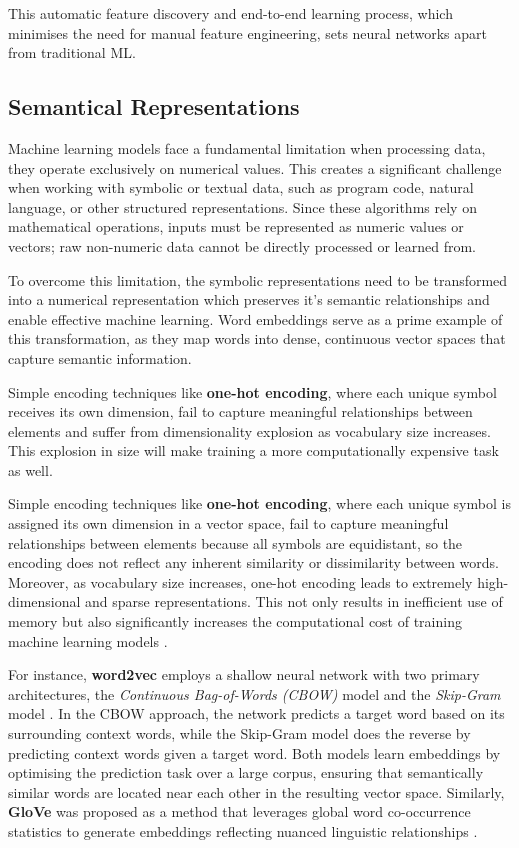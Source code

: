 This automatic feature discovery and end-to-end learning process, which minimises the need for manual feature engineering, sets neural networks apart from traditional ML.

\subsection{Semantical Representations}
Machine learning models face a fundamental limitation when processing data, they operate exclusively on numerical values. This creates a significant challenge when working with symbolic or textual data, such as program code, natural language, or other structured representations. Since these algorithms rely on mathematical operations, inputs must be represented as numeric values or vectors; raw non-numeric data cannot be directly processed or learned from.

To overcome this limitation, the symbolic representations need to be transformed into a numerical representation which preserves it's semantic relationships and enable effective machine learning. Word embeddings serve as a prime example of this transformation, as they map words into dense, continuous vector spaces that capture semantic information.

Simple encoding techniques like \textbf{one-hot encoding}, where each unique symbol receives its own dimension, fail to capture meaningful relationships between elements and suffer from dimensionality explosion as vocabulary size increases. This explosion in size will make training a more computationally expensive task as well.

Simple encoding techniques like \textbf{one-hot encoding}, where each unique symbol is assigned its own dimension in a vector space, fail to capture meaningful relationships between elements because all symbols are equidistant, so the encoding does not reflect any inherent similarity or dissimilarity between words. Moreover, as vocabulary size increases, one-hot encoding leads to extremely high-dimensional and sparse representations. This not only results in inefficient use of memory but also significantly increases the computational cost of training machine learning models \cite{DeepLearningGoodfellow}.

For instance, \textbf{word2vec} employs a shallow neural network with two primary architectures, the \textit{Continuous Bag-of-Words (CBOW)} model and the \textit{Skip-Gram} model \cite{Word2Vec}. In the CBOW approach, the network predicts a target word based on its surrounding context words, while the Skip-Gram model does the reverse by predicting context words given a target word. Both models learn embeddings by optimising the prediction task over a large corpus, ensuring that semantically similar words are located near each other in the resulting vector space. Similarly,  \textbf{GloVe}  was proposed as a method that leverages global word co-occurrence statistics to generate embeddings reflecting nuanced linguistic relationships \cite{GloVe}.

